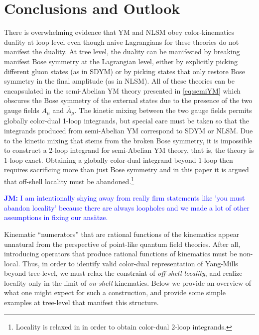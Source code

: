 \documentclass[11pt,letter]{article}
\newcommand{\jm}[1]{\textcolor{blue}{\textbf{JM: }{#1}}}
\newcommand{\ansatze}{ans\"atze} %
\begin{document}
\section{Conclusions and Outlook}
There is overwhelming evidence that YM and NLSM obey color-kinematics duality at loop level even though naive Lagrangians for these theories do not manifest the duality.
At tree level, the duality can be manifested by breaking manifest Bose symmetry at the Lagrangian level, either by explicitly picking different gluon states (as in SDYM) or by picking states that only restore Bose symmetry in the final amplitude (as in NLSM).
All of these theories can be encapsulated in the semi-Abelian YM theory presented in \cref{eq:semiYM} which obscures the Bose symmetry of the external states due to the presence of the two gauge fields $A_\mu$ and $\bar{A}_\mu$.
The kinetic mixing between the two gauge fields permits globally color-dual 1-loop integrands, but special care must be taken so that the integrands produced from semi-Abelian YM correspond to SDYM or NLSM.
Due to the kinetic mixing that stems from the broken Bose symmetry, it is impossible to construct a 2-loop integrand for semi-Abelian YM theory, that is, the theory is 1-loop exact.
Obtaining a globally color-dual integrand beyond 1-loop then requires sacrificing more than just Bose symmetry and in this paper it is argued that off-shell locality must be abandoned.\footnote{Locality is relaxed in \cite{Mogull:2015adi} in order to obtain color-dual 2-loop integrands.}

\jm{I am intentionally shying away from really firm statements like 'you must abandon locality' because there are always loopholes and we made a lot of other assumptions in fixing our \ansatze{}.}

Kinematic ``numerators'' that are rational functions of the kinematics appear unnatural from the perspective of point-like quantum field theories. After all, introducing operators that produce rational functions of kinematics must be non-local. Thus, in order to identify valid color-dual representation of Yang-Mills beyond tree-level, we must relax the constraint of \textit{off-shell locality}, and realize locality only in the limit of \textit{on-shell} kinematics. Below we provide an overview of what one might expect for such a construction, and provide some simple examples at tree-level that manifest this structure. 
\end{document}
